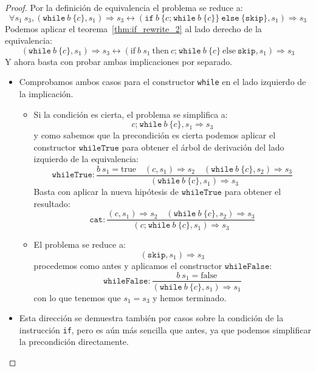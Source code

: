 \documentclass[
  a4paper, 
  10pt, 
  parskip=half, 
  toc=bibliography,
]{scrbook}
\theoremstyle{definition}
\theoremstyle{bolddef}
\newcommand{\funfont}[1]{\texttt{#1}}
\renewcommand{\implies}{\rightarrow}
\renewcommand{\impliedby}{\leftarrow}
\renewcommand{\iff}{\leftrightarrow}
\newcommand{\ImpIfElse}[3]{\texttt{if} \ {#1} \ \{{#2}\} \ \texttt{else} \ \{{#3}\}}
\newcommand{\ImpWhile}[2]{\texttt{while} \ {#1} \ \{{#2}\}}
\newcommand{\ImpConcat}[2]{{#1} \texttt{;} \ {#2}}
\newcommand{\ImpSkip}{\texttt{skip}}
\newcommand{\LeanIfElse}[3]{\text{if} \ {#1} \ \text{then} \ {#2} \ \text{else} \ {#3}}
\newcommand{\LeanTrue}{\text{true}}
\newcommand{\LeanFalse}{\text{false}}
\newcommand{\bigstep}{\Longrightarrow}
\begin{document}
\begin{proof}
  Por la definición de equivalencia el problema se reduce a:
  \[
    \forall s_1 \ s_3, (\ImpWhile{b}{c}, s_1) \bigstep s_3 \iff
    (\ImpIfElse{b}{\ImpConcat{c}{\ImpWhile{b}{c}}}{\ImpSkip}, s_1) \bigstep s_3
  \]
  Podemos aplicar el teorema~\ref{thm:if_rewrite_2} al lado derecho de la
  equivalencia:
  \[
    (\ImpWhile{b}{c}, s_1) \bigstep s_3 \iff
    (\LeanIfElse{b \ s_1}{\ImpConcat{c}{\ImpWhile{b}{c}}}{\ImpSkip}, s_1) \bigstep s_3
  \]
  Y ahora basta con probar ambas implicaciones por separado.
  \begin{itemize}
    \item[(\(\implies\))] 
    Comprobamos ambos casos para el constructor \texttt{while} en el lado izquierdo de la implicación.
    \begin{itemize}
      \item[(\(b \ s_1\))]
      Si la condición es cierta, el problema se simplifica a:
      \[
        \ImpConcat{c}{\ImpWhile{b}{c}}, s_1 \bigstep s_3
      \]
      y como sabemos que la precondición es cierta podemos aplicar el constructor
      \(\funfont{whileTrue}\) para obtener el árbol de derivación del lado izquierdo de la equivalencia:
      \[
        \funfont{whileTrue}: \frac{
          b \ s_1 = \LeanTrue
          \quad
          (c, s_1) \bigstep s_2 
          \quad 
          (\ImpWhile{b}{c}, s_2) \bigstep s_3
        }{
          (\ImpWhile{b}{c}, s_1) \bigstep s_3
        }
      \]
      Basta con aplicar la nueva hipótesis de \(\funfont{whileTrue}\) para
      obtener el resultado:
      \[
        \funfont{cat}: \frac{
          (c, s_1) \bigstep s_2
          \quad
          (\ImpWhile{b}{c}, s_2) \bigstep s_3
        }{
          (\ImpConcat{c}{\ImpWhile{b}{c}}, s_1) \bigstep s_3
        }
      \]
      \item[(\(\lnot b \ s_1\))]
      El problema se reduce a:
      \[
        (\ImpSkip, s_1) \bigstep s_3
      \]
      procedemos como antes y aplicamos el constructor \(\funfont{whileFalse}\):
      \[
        \funfont{whileFalse}: \frac{
          b \ s_1 = \LeanFalse         
        }{
          (\ImpWhile{b}{c}, s_1) \bigstep s_1
        }
      \]
      con lo que tenemos que \(s_1 = s_3\) y hemos terminado.
    \end{itemize}

    \item[(\(\impliedby\))]
    Esta dirección se demuestra también por casos sobre la condición
    de la instrucción \texttt{if}, pero es aún más sencilla que antes, ya que podemos
    simplificar la precondición directamente.
  \end{itemize}
\end{proof}
\end{document}
